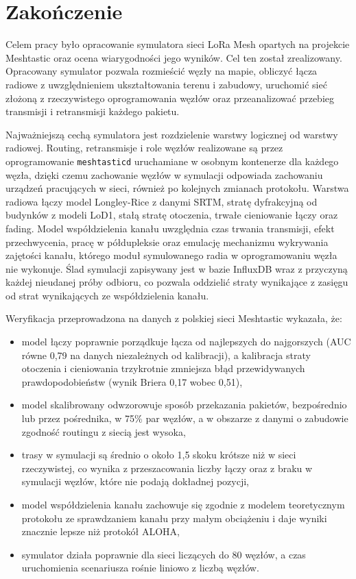 \chapter*{Zakończenie}

Celem pracy było opracowanie symulatora sieci LoRa Mesh opartych na projekcie Meshtastic oraz ocena wiarygodności jego wyników. Cel ten został zrealizowany. Opracowany symulator pozwala rozmieścić węzły na mapie, obliczyć łącza radiowe z uwzględnieniem ukształtowania terenu i zabudowy, uruchomić sieć złożoną z rzeczywistego oprogramowania węzłów oraz przeanalizować przebieg transmisji i retransmisji każdego pakietu.

Najważniejszą cechą symulatora jest rozdzielenie warstwy logicznej od warstwy radiowej. Routing, retransmisje i role węzłów realizowane są przez oprogramowanie \texttt{meshtasticd} uruchamiane w osobnym kontenerze dla każdego węzła, dzięki czemu zachowanie węzłów w symulacji odpowiada zachowaniu urządzeń pracujących w sieci, również po kolejnych zmianach protokołu. Warstwa radiowa łączy model Longley-Rice z danymi SRTM, stratę dyfrakcyjną od budynków z modeli LoD1, stałą stratę otoczenia, trwałe cieniowanie łączy oraz fading. Model współdzielenia kanału uwzględnia czas trwania transmisji, efekt przechwycenia, pracę w półdupleksie oraz emulację mechanizmu wykrywania zajętości kanału, którego moduł symulowanego radia w oprogramowaniu węzła nie wykonuje. Ślad symulacji zapisywany jest w bazie InfluxDB wraz z przyczyną każdej nieudanej próby odbioru, co pozwala oddzielić straty wynikające z zasięgu od strat wynikających ze współdzielenia kanału.

Weryfikacja przeprowadzona na danych z polskiej sieci Meshtastic wykazała, że:
\begin{itemize}
\item model łączy poprawnie porządkuje łącza od najlepszych do najgorszych (AUC równe 0,79 na danych niezależnych od kalibracji), a kalibracja straty otoczenia i cieniowania trzykrotnie zmniejsza błąd przewidywanych prawdopodobieństw (wynik Briera 0,17 wobec 0,51),
\item model skalibrowany odwzorowuje sposób przekazania pakietów, bezpośrednio lub przez pośrednika, w 75\% par węzłów, a w obszarze z danymi o zabudowie zgodność routingu z siecią jest wysoka,
\item trasy w symulacji są średnio o około 1,5 skoku krótsze niż w sieci rzeczywistej, co wynika z przeszacowania liczby łączy oraz z braku w symulacji węzłów, które nie podają dokładnej pozycji,
\item model współdzielenia kanału zachowuje się zgodnie z modelem teoretycznym protokołu ze sprawdzaniem kanału przy małym obciążeniu i daje wyniki znacznie lepsze niż protokół ALOHA,
\item symulator działa poprawnie dla sieci liczących do 80 węzłów, a czas uruchomienia scenariusza rośnie liniowo z liczbą węzłów.
\end{itemize}


